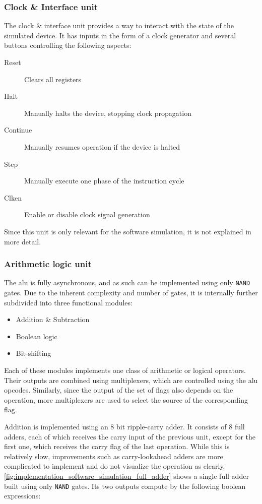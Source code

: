 \subsubsection{Clock \& Interface unit}

The clock \& interface unit provides a way to interact with the state of the simulated device. It has inputs in the form of a clock generator and several buttons controlling the following aspects:

\begin{description}
    \item[Reset] Clears all registers
    \item[Halt] Manually halts the device, stopping clock propagation
    \item[Continue] Manually resumes operation if the device is halted
    \item[Step] Manually execute one phase of the instruction cycle
    \item[Clken] Enable or disable clock signal generation     
\end{description}

Since this unit is only relevant for the software simulation, it is not explained in more detail.

\subsubsection{Arithmetic logic unit}

The \ac{alu} is fully asynchronous, and as such can be implemented using only \texttt{NAND} gates. Due to the inherent complexity and number of gates, it is internally further subdivided into three functional modules:

\begin{itemize}
    \item Addition \& Subtraction
    \item Boolean logic
    \item Bit-shifting
\end{itemize}

Each of these modules implements one class of arithmetic or logical operators. Their outputs are combined using multiplexers, which are controlled using the \ac{alu} opcodes. Similarly, since the output of the set of flags also depends on the operation, more multiplexers are used to select the source of the corresponding flag.

Addition is implemented using an 8 bit ripple-carry adder. It consists of 8 full adders, each of which receives the carry input of the previous unit, except for the first one, which receives the carry flag of the last operation. While this is relatively slow, improvements such as carry-lookahead adders are more complicated to implement and do not visualize the operation as clearly. \autoref{fig:implementation_software_simulation_full_adder} shows a single full adder built using only \texttt{NAND} gates. Its two outputs compute by the following boolean expressions:

